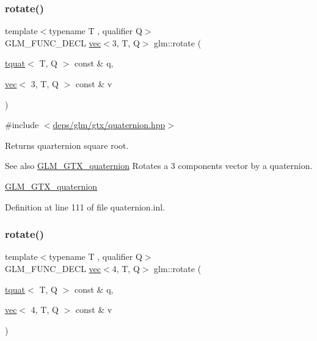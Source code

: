 \subsubsection{\texorpdfstring{rotate()}{rotate()}\hspace{0.1cm}{\footnotesize\ttfamily [1/2]}}
{\footnotesize\ttfamily template$<$typename T , qualifier Q$>$ \\
G\+L\+M\+\_\+\+F\+U\+N\+C\+\_\+\+D\+E\+CL \hyperlink{structglm_1_1vec}{vec}$<$3, T, Q$>$ glm\+::rotate (\begin{DoxyParamCaption}\item[{\hyperlink{structglm_1_1tquat}{tquat}$<$ T, Q $>$ const \&}]{q,  }\item[{\hyperlink{structglm_1_1vec}{vec}$<$ 3, T, Q $>$ const \&}]{v }\end{DoxyParamCaption})}



{\ttfamily \#include $<$\hyperlink{gtx_2quaternion_8hpp}{deps/glm/gtx/quaternion.\+hpp}$>$}

Returns quarternion square root.

\begin{DoxySeeAlso}{See also}
\hyperlink{group__gtx__quaternion}{G\+L\+M\+\_\+\+G\+T\+X\+\_\+quaternion} Rotates a 3 components vector by a quaternion.

\hyperlink{group__gtx__quaternion}{G\+L\+M\+\_\+\+G\+T\+X\+\_\+quaternion} 
\end{DoxySeeAlso}


Definition at line 111 of file quaternion.\+inl.

\mbox{\label{group__gtx__quaternion_ga97a5f8af1d63056b85a53ac28042fe77}} 
\subsubsection{\texorpdfstring{rotate()}{rotate()}\hspace{0.1cm}{\footnotesize\ttfamily [2/2]}}
{\footnotesize\ttfamily template$<$typename T , qualifier Q$>$ \\
G\+L\+M\+\_\+\+F\+U\+N\+C\+\_\+\+D\+E\+CL \hyperlink{structglm_1_1vec}{vec}$<$4, T, Q$>$ glm\+::rotate (\begin{DoxyParamCaption}\item[{\hyperlink{structglm_1_1tquat}{tquat}$<$ T, Q $>$ const \&}]{q,  }\item[{\hyperlink{structglm_1_1vec}{vec}$<$ 4, T, Q $>$ const \&}]{v }\end{DoxyParamCaption})}



